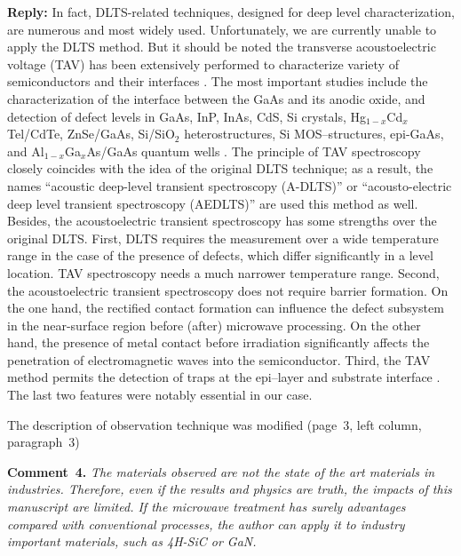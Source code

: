 \documentclass[10pt]{iopart}
\begin{document}
\noindent
\textcolor[rgb]{0.51,0.00,0.00}{\textbf{Reply:}}
In fact, DLTS-related techniques, designed for deep level characterization,
are numerous and most widely used.
Unfortunately, we are currently unable to apply the DLTS method.
But it should be noted the transverse acoustoelectric voltage (TAV)
has been extensively performed to characterize variety of  semiconductors and their
interfaces
\cite{TAV:1992ZnSeGaAsphoto,TAV:2003MIS_hetero,TAV:1989hetero,TAV:1993general,TAV:1991SiSiO2,TAV:1989SiGaAsnodefect,
TAV:1991gener,TAV:1999GaAs_AlGaAs,TAV:1993MIS,TAV:1991SiMOS,TAV:1993GaAs,OstrovPAN,OlikhSSC,OstrovskiiSST}.
The most important studies include the
characterization of the  interface between  the GaAs and  its anodic oxide,
and detection of  defect levels
in GaAs, InP, InAs, CdS, Si crystals,
Hg$_{1-x}$Cd$_x$Tel/CdTe, ZnSe/GaAs, Si/SiO$_2$ heterostructures,
Si MOS--structures,
epi-GaAs,
and Al$_{1-x}$Ga$_x$As/GaAs quantum wells
\cite{TAV:1991gener,TAV:1992ZnSeGaAsphoto,TAV:1991SiSiO2,OlikhSSC,TAV:1993MIS,TAV:1999GaAs_AlGaAs}.
The  principle of TAV  spectroscopy closely coincides with the idea  of  the original  DLTS
technique; as a result, the names
``acoustic  deep-level  transient spectroscopy
(A-DLTS)''
 \cite{TAV:2003MIS_hetero,TAV:1999GaAs_AlGaAs,TAV:1993MIS,TAV:1991SiMOS}
or ``acousto-electric  deep  level  transient  spectroscopy
(AEDLTS)''
\cite{TAV:1993GaAs}
are used this method as well.
Besides, the acoustoelectric transient spectroscopy has some strengths over the original  DLTS.
First, DLTS requires the measurement over a wide temperature range
in the case of the presence of defects, which differ significantly in a level location.
TAV spectroscopy needs a much narrower temperature range.
Second, the acoustoelectric transient spectroscopy does not require barrier formation.
On the one hand, the rectified contact formation can influence the defect subsystem
in the near-surface region before (after) microwave processing.
On the other hand, the presence of metal contact before irradiation
significantly affects the penetration of electromagnetic waves into the semiconductor.
Third, the TAV method permits the detection of traps at the
epi–layer and substrate interface \cite{OstrovPAN,OlikhSSC,OstrovskiiSST}.
The last two features were notably essential in our case.


The description of observation technique was modified
(page~3, left column, paragraph~3)



\vspace{1cm}
\noindent
\textcolor[rgb]{0.00,0.50,1.00}{\textbf{Comment~4.}}
\emph{The materials observed are not the state of the art materials in industries.
Therefore, even if the results and physics are truth,
the impacts of this manuscript are limited.
If the microwave treatment has surely advantages compared
with conventional processes, the author can apply it to industry important materials, such as 4H-SiC or GaN.}
\end{document}
